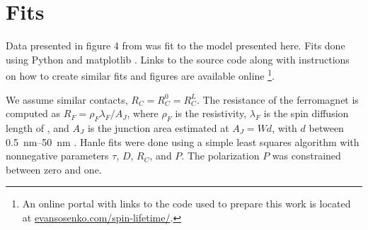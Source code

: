 \section{Fits}
\label{s:fits}

Data presented in figure 4 from
\cite{PhysRevLett.105.167202}
was fit to the model presented here.
Fits done using Python and matplotlib
\cite{Hunter:2007}.
Links to the source code along with instructions
on how to create similar fits and figures are available online
\footnote{
  An online portal with links
  to the code used to prepare this work is located at
  \href{http://evansosenko.com/spin-lifetime/}{evansosenko.com/spin-lifetime/}.
}.

We assume similar contacts, $R_C = R_C^0 = R_C^L$.
The resistance of the ferromagnet  is computed as
$R_F = ρ_F λ_F / A_J$,
where $ρ_F$ is the  resistivity,
$λ_F$ is the spin diffusion length of ,
and $A_J$ is the junction area estimated at $A_J = W d$,
with $d$ between \SIrange[range-phrase={ and }]{0.5}{50}{\nano \meter}
\cite{PhysRevLett.105.167202}.
Hanle fits were done using a simple least squares algorithm
with nonnegative parameters $τ$, $D$, $R_C$, and $P$.
The polarization $P$ was constrained between zero and one.

